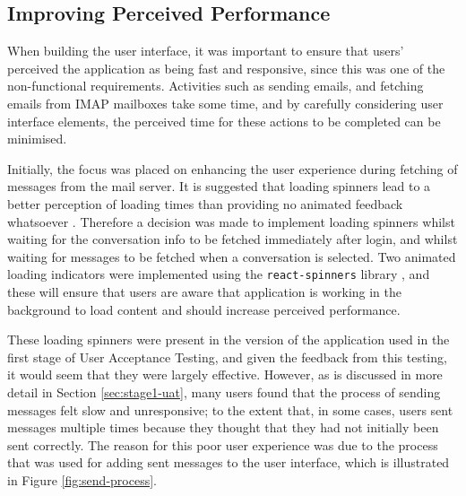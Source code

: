 \subsection{Improving Perceived Performance} %
When building the user interface, it was important to ensure that users' perceived the application as being fast and responsive, since this was one of the non-functional requirements. Activities such as sending emails, and fetching emails from IMAP mailboxes take some time, and by carefully considering user interface elements, the perceived time for these actions to be completed can be minimised.

Initially, the focus was placed on enhancing the user experience during fetching of messages from the mail server. It is suggested that loading spinners lead to a better perception of loading times than providing no animated feedback whatsoever \cite{persson2019improving}. Therefore a decision was made to implement loading spinners whilst waiting for the conversation info to be fetched immediately after login, and whilst waiting for messages to be fetched when a conversation is selected. Two animated loading indicators were implemented using the \verb|react-spinners| library \cite{react-spinners}, and these will ensure that users are aware that application is working in the background to load content and should increase perceived performance.

These loading spinners were present in the version of the application used in the first stage of User Acceptance Testing, and given the feedback from this testing, it would seem that they were largely effective. However, as is discussed in more detail in Section \ref{sec:stage1-uat}, many users found that the process of sending messages felt slow and unresponsive; to the extent that, in some cases, users sent messages multiple times because they thought that they had not initially been sent correctly. The reason for this poor user experience was due to the process that was used for adding sent messages to the user interface, which is illustrated in Figure \ref{fig:send-process}.

